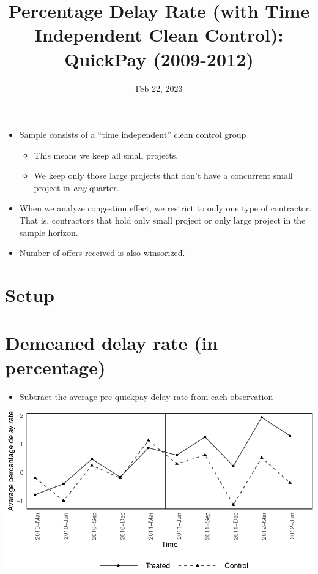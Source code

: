 \documentclass[
]{article}
\title{Percentage Delay Rate (with Time Independent Clean Control):
QuickPay (2009-2012)}
\author{}
\date{\vspace{-2.5em}Feb 22, 2023}
\providecommand{\tightlist}{%
  \setlength{\itemsep}{0pt}\setlength{\parskip}{0pt}}
\begin{document}
\maketitle

\begin{itemize}
\item
  Sample consists of a ``time independent'' clean control group

  \begin{itemize}
  \tightlist
  \item
    This means we keep all small projects.
  \item
    We keep only those large projects that don't have a concurrent small
    project in \emph{any} quarter.
  \end{itemize}
\item
  When we analyze congestion effect, we restrict to only one type of
  contractor. That is, contractors that hold only small project or only
  large project in the sample horizon.
\item
  Number of offers received is also winsorized.
\end{itemize}

\hypertarget{setup}{%
\section{Setup}\label{setup}}

\hypertarget{demeaned-delay-rate-in-percentage}{%
\section{Demeaned delay rate (in
percentage)}\label{demeaned-delay-rate-in-percentage}}

\begin{itemize}
\tightlist
\item
  Subtract the average pre-quickpay delay rate from each observation
\end{itemize}

\includegraphics{qp_first_pc_delay_clean_control_time_independent_files/figure-latex/demeaned_plot_one_type-1.pdf}
\end{document}
